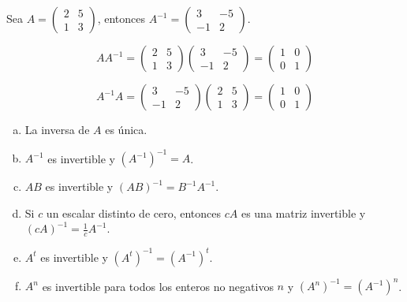 \begin{ejem}
Sea $A = \begin{pmatrix} 2 & 5 \\ 1 & 3 \end{pmatrix}$, entonces $A^{-1} = \begin{pmatrix} 3 & -5 \\ -1 & 2 \end{pmatrix}$.


\[A A^{-1} =  \begin{pmatrix} 2 & 5 \\ 1 & 3 \end{pmatrix}\begin{pmatrix} 3 & -5 \\ -1 & 2 \end{pmatrix} = \begin{pmatrix} 1 & 0 \\ 0 & 1 \end{pmatrix}\]


\[A^{-1}A = \begin{pmatrix} 3 & -5 \\ -1 & 2 \end{pmatrix}  \begin{pmatrix} 2 & 5 \\ 1 & 3 \end{pmatrix} =\begin{pmatrix} 1 & 0 \\ 0 & 1 \end{pmatrix} \]
\end{ejem}




\begin{thm}
\begin{enumerate}[(a)]
Sean $A$ y $B$ dos matrices invertibles de orden $n \times n$. Entonces:
    \item La  inversa de $A$ es única.
    
    \item $A^{-1}$ es invertible y $(A^{-1})^{-1} = A$.

    \item $AB$ es invertible y $(AB)^{-1} = B^{-1}A^{-1}$.


    \item Si $c$ un escalar distinto de cero, entonces $cA$ es una matriz invertible y $(cA)^{-1} = \frac{1}{c} A^{-1}$.

    \item $A^t$ es invertible y $(A^t)^{-1} = (A^{-1})^t$.

    \item $A^n$ es invertible para todos los enteros no negativos $n$ y $(A^n)^{-1} = (A^{-1})^n$.
\end{enumerate}
\end{thm}

